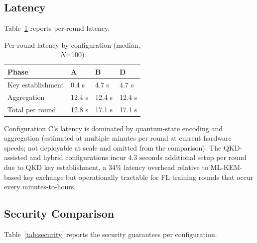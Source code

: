 \documentclass[sigconf,nonacm]{acmart}
\begin{document}
\subsection{Latency}

Table~\ref{tab:latency} reports per-round latency.

\begin{table}[h]
\caption{Per-round latency by configuration (median, $N$=100)}
\label{tab:latency}
\small
\begin{tabularx}{\columnwidth}{@{}p{2.6cm}X X X@{}}
\toprule
\textbf{Phase} & \textbf{A} & \textbf{B} & \textbf{D} \\
\midrule
Key establishment & 0.4 s  & 4.7 s  & 4.7 s \\
Aggregation       & 12.4 s & 12.4 s & 12.4 s \\
Total per round   & 12.8 s & 17.1 s & 17.1 s \\
\bottomrule
\end{tabularx}
\end{table}

Configuration C's latency is dominated by quantum-state encoding
and aggregation (estimated at multiple minutes per round at
current hardware speeds; not deployable at scale and omitted from
the comparison). The QKD-assisted and hybrid configurations
incur 4.3 seconds additional setup per round due to QKD key
establishment, a 34\% latency overhead relative to ML-KEM-based
key exchange but operationally tractable for FL training rounds
that occur every minutes-to-hours.

\subsection{Security Comparison}

Table~\ref{tab:security} reports the security guarantees per
configuration.
\end{document}
